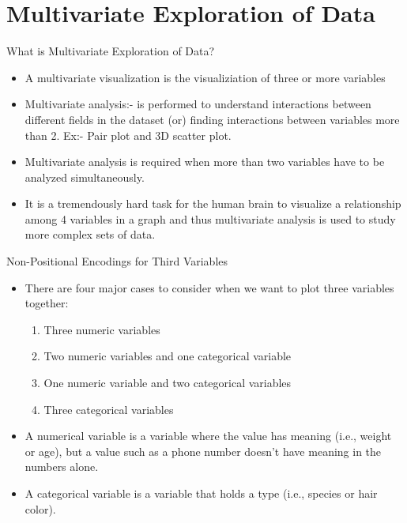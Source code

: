 \documentclass[12pt]{beamer}
\begin{document}
\section{Multivariate Exploration of Data}
    \begin{frame}{What is Multivariate Exploration of Data?}
    	\begin{itemize}
    		\item A multivariate visualization is the visualiziation of three or more variables
    	    \item Multivariate analysis:- is performed to understand interactions between different fields in the dataset (or) finding interactions between variables more than 2. Ex:- Pair plot and 3D scatter plot.
    	    \item Multivariate analysis is required when more than two variables have to be analyzed simultaneously. 
    	    \item It is a tremendously hard task for the human brain to visualize a relationship among 4 variables in a graph and thus multivariate analysis is used to study more complex sets of data. 
    	\end{itemize}
    \end{frame}
    \begin{frame}{Non-Positional Encodings for Third Variables}
    	\begin{itemize}
    		\item There are four major cases to consider when we want to plot three variables together:
    		\begin{enumerate}
    			\item Three numeric variables
    			\item Two numeric variables and one categorical variable
    			\item One numeric variable and two categorical variables
    			\item Three categorical variables
    		\end{enumerate}
    		\item A numerical variable is a variable where the value has meaning (i.e., weight or age), but a value such as a phone number doesn't have meaning in the numbers alone. 
    		\item A categorical variable is a variable that holds a type (i.e., species or hair color).
    	\end{itemize}
    \end{frame}
\end{document}

